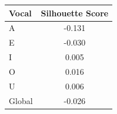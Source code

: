 \begin{tabular}{lc}
\toprule
\rowcolor{col01}
Vocal & Silhouette Score \\
\midrule
A & -0.131 \\
E & -0.030 \\
I & 0.005 \\
O & 0.016 \\
U & 0.006 \\
Global & -0.026 \\
\bottomrule
\end{tabular}
